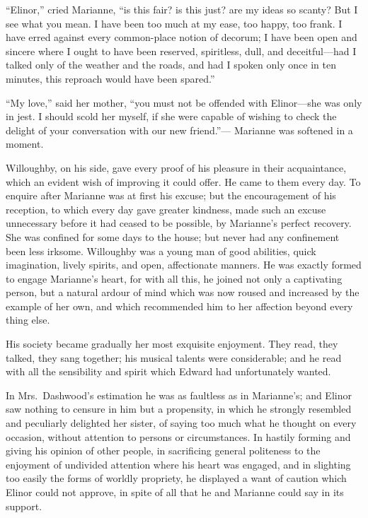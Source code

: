 \documentclass{article}
\begin{document}
``Elinor,'' cried Marianne, ``is this fair? is this
just? are my ideas so scanty?  But I see what you mean.
I have been too much at my ease, too happy, too frank.
I have erred against every common-place notion of decorum;
I have been open and sincere where I ought to have
been reserved, spiritless, dull, and deceitful---had
I talked only of the weather and the roads, and had I
spoken only once in ten minutes, this reproach would have
been spared.''

``My love,'' said her mother, ``you must not be offended
with Elinor---she was only in jest.  I should scold
her myself, if she were capable of wishing to check
the delight of your conversation with our new friend.''---%
Marianne was softened in a moment.

Willoughby, on his side, gave every proof of his
pleasure in their acquaintance, which an evident wish
of improving it could offer.  He came to them every day.
To enquire after Marianne was at first his excuse; but the
encouragement of his reception, to which every day gave
greater kindness, made such an excuse unnecessary before it
had ceased to be possible, by Marianne's perfect recovery.
She was confined for some days to the house; but never had
any confinement been less irksome.  Willoughby was a young
man of good abilities, quick imagination, lively spirits,
and open, affectionate manners.  He was exactly formed
to engage Marianne's heart, for with all this, he joined
not only a captivating person, but a natural ardour
of mind which was now roused and increased by the example
of her own, and which recommended him to her affection
beyond every thing else.

His society became gradually her most exquisite enjoyment.
They read, they talked, they sang together; his musical
talents were considerable; and he read with all the
sensibility and spirit which Edward had unfortunately wanted.

In Mrs.\ Dashwood's estimation he was as faultless
as in Marianne's; and Elinor saw nothing to censure in him
but a propensity, in which he strongly resembled and peculiarly
delighted her sister, of saying too much what he thought on
every occasion, without attention to persons or circumstances.
In hastily forming and giving his opinion of other people,
in sacrificing general politeness to the enjoyment
of undivided attention where his heart was engaged,
and in slighting too easily the forms of worldly propriety,
he displayed a want of caution which Elinor could not approve,
in spite of all that he and Marianne could say in its support.
\end{document}
